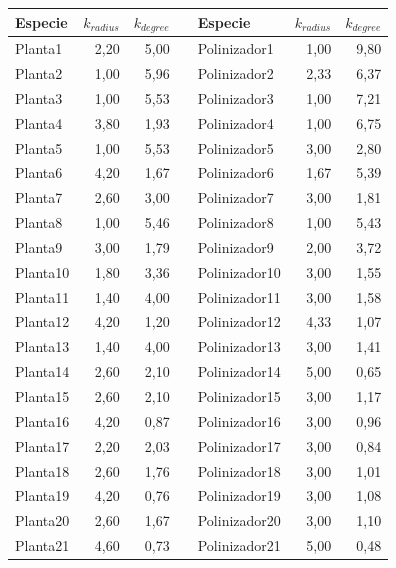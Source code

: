 \clearpage

\begin{table}[htbp]
\small
  \centering

    \begin{tabular}{lrrrlrr}
    \toprule
    Especie & $k_{radius}$ & $k_{degree}$ &      & Especie & $k_{radius}$ & $k_{degree}$ \\
    \midrule
    Planta1 & 2,20 & 5,00 &      & Polinizador1 & 1,00 & 9,80 \\
    Planta2 & 1,00 & 5,96 &      & Polinizador2 & 2,33 & 6,37 \\
    Planta3 & 1,00 & 5,53 &      & Polinizador3 & 1,00 & 7,21 \\
    Planta4 & 3,80 & 1,93 &      & Polinizador4 & 1,00 & 6,75 \\
    Planta5 & 1,00 & 5,53 &      & Polinizador5 & 3,00 & 2,80 \\
    Planta6 & 4,20 & 1,67 &      & Polinizador6 & 1,67 & 5,39 \\
    Planta7 & 2,60 & 3,00 &      & Polinizador7 & 3,00 & 1,81 \\
    Planta8 & 1,00 & 5,46 &      & Polinizador8 & 1,00 & 5,43 \\
    Planta9 & 3,00 & 1,79 &      & Polinizador9 & 2,00 & 3,72 \\
    Planta10 & 1,80 & 3,36 &      & Polinizador10 & 3,00 & 1,55 \\
    Planta11 & 1,40 & 4,00 &      & Polinizador11 & 3,00 & 1,58 \\
    Planta12 & 4,20 & 1,20 &      & Polinizador12 & 4,33 & 1,07 \\
    Planta13 & 1,40 & 4,00 &      & Polinizador13 & 3,00 & 1,41 \\
    Planta14 & 2,60 & 2,10 &      & Polinizador14 & 5,00 & 0,65 \\
    Planta15 & 2,60 & 2,10 &      & Polinizador15 & 3,00 & 1,17 \\
    Planta16 & 4,20 & 0,87 &      & Polinizador16 & 3,00 & 0,96 \\
    Planta17 & 2,20 & 2,03 &      & Polinizador17 & 3,00 & 0,84 \\
    Planta18 & 2,60 & 1,76 &      & Polinizador18 & 3,00 & 1,01 \\
    Planta19 & 4,20 & 0,76 &      & Polinizador19 & 3,00 & 1,08 \\
    Planta20 & 2,60 & 1,67 &      & Polinizador20 & 3,00 & 1,10 \\
    Planta21 & 4,60 & 0,73 &      & Polinizador21 & 5,00 & 0,48 \\

\end{tabular}
\end{table}
